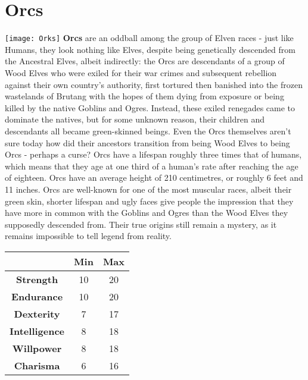 \documentclass[openany,10pt,a4paper]{book}
\begin{document}
\section{Orcs}
\texttt{[image: Orks]}\newline
\textbf{Orcs} are an oddball among the group of Elven races - just like Humans, they look nothing like Elves, despite being genetically descended from the Ancestral Elves, albeit indirectly: the Orcs are descendants of a group of Wood Elves who were exiled for their war crimes and subsequent rebellion against their own country's authority, first tortured then banished into the frozen wastelands of Brutang with the hopes of them dying from exposure or being killed by the native Goblins and Ogres. Instead, these exiled renegades came to dominate the natives, but for some unknown reason, their children and descendants all became green-skinned beings. Even the Orcs themselves aren't sure today how did their ancestors transition from being Wood Elves to being Orcs - perhaps a curse?\newline
Orcs have a lifespan roughly three times that of humans, which means that they age at one third of a human's rate after reaching the age of eighteen. Orcs have an average height of 210 centimetres, or roughly 6 feet and 11 inches. Orcs are well-known for one of the most muscular races, albeit their green skin, shorter lifespan and ugly faces give people the impression that they have more in common with the Goblins and Ogres than the Wood Elves they supposedly descended from. Their true origins still remain a mystery, as it remains impossible to tell legend from reality.\newline
\begin{tabular}{|c|c|c|}
\hline
 & \textbf{Min} & \textbf{Max} \\ \hline
\textbf{Strength} & 10 & 20 \\ \hline
\textbf{Endurance} & 10 & 20 \\ \hline
\textbf{Dexterity} & 7 & 17 \\ \hline
\textbf{Intelligence} & 8 & 18 \\ \hline
\textbf{Willpower} & 8 & 18 \\ \hline
\textbf{Charisma} & 6 & 16 \\ \hline
\end{tabular}\newline
{}\newpage
\end{document}
